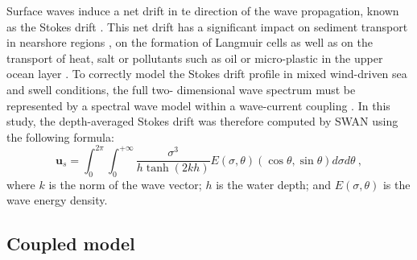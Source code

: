 \documentclass[preprint,12pt,authoryear]{elsarticle}
\begin{document}
Surface waves induce a net drift in te direction of the wave propagation, known as the Stokes drift \citep{van2018stokes,stokes1880theory}. This net drift has a significant impact on sediment transport in nearshore regions \citep{hoefel2003wave}, on the formation of Langmuir cells \citep{langmuir1938surface, craik1976rational} as well as on the transport of heat, salt or pollutants such as oil or micro-plastic in the upper ocean layer \citep{mcwilliams2000vertical,rohrs2012observation,drivdal2014wave}. To correctly model the Stokes drift profile in mixed wind-driven sea and swell conditions, the full two- dimensional wave spectrum must be represented by a spectral wave model within a wave-current coupling \citep{van2018stokes}. In this study, the depth-averaged Stokes drift was therefore computed by SWAN using the following formula:
\begin{equation}
    \mathbf{u}_{s} = \int_0^{2\pi}\int_0^{+\infty} \dfrac{\sigma^3}{h\tanh(2kh)}E(\sigma,\theta)(\cos\theta, \sin\theta)d\sigma d\theta~, \label{eq:stokes}
\end{equation}
where $k$ is the norm of the wave vector; $h$ is the water depth; and $E(\sigma,\theta)$ is the wave energy density.

\subsection{Coupled model}
\end{document}

